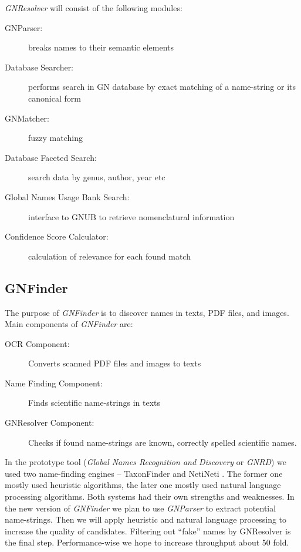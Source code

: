 \documentclass[11pt]{article}
\begin{document}
\textit{GNResolver} will consist of the following modules:

\begin{description}

  \item[GNParser:] breaks names to their semantic elements

  \item[Database Searcher:] performs search in GN database by exact matching of
    a name-string or its canonical form

  \item[GNMatcher:] fuzzy matching

  \item[Database Faceted Search:] search data by genus, author, year etc

  \item[Global Names Usage Bank Search:] interface to GNUB \cite{Pyle2016} to
    retrieve nomenclatural information

  \item[Confidence Score Calculator:] calculation of relevance for each found
    match \cite{Patterson:inpress-a}

\end{description}

\subsection{GNFinder}

The purpose of \textit{GNFinder} is to discover names in texts, PDF files, and
images. Main components of \textit{GNFinder} are:

\begin{description}
  \item[OCR Component:] Converts scanned PDF files and images to texts
  \item[Name Finding Component:] Finds scientific name-strings in texts
  \item[GNResolver Component:] Checks if found name-strings are known,
    correctly spelled scientific names.
\end{description}

In the prototype tool (\textit{Global Names Recognition and Discovery} or
\textit{GNRD}) \cite{gnrd} we used two name-finding engines -- TaxonFinder and
NetiNeti \cite{Akella2012}. The former one mostly used heuristic algorithms,
the later one mostly used natural language processing algorithms. Both systems
had their own strengths and weaknesses. In the new version of \textit{GNFinder}
we plan to use \textit{GNParser} \cite{gnparser} to extract potential
name-strings.  Then we will apply heuristic and natural language processing to
increase the quality of candidates. Filtering out ``fake'' names by GNResolver
is the final step. Performance-wise we hope to increase throughput about 50
fold.
\end{document}
